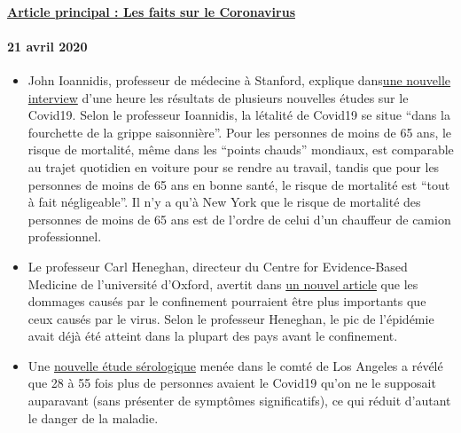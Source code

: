 \hypertarget{article-principal--les-faits-sur-le-coronavirus}{%
\paragraph{\texorpdfstring{\href{https://swprs.org/coronavirus-un-medecin-suisse-parle/}{Article
principal : Les faits sur le
Coronavirus}}{Article principal : Les faits sur le Coronavirus}}\label{article-principal--les-faits-sur-le-coronavirus}}

\hypertarget{21-avril-2020}{%
\paragraph{21 avril 2020}\label{21-avril-2020}}

\begin{itemize}
\tightlist
\item
  John Ioannidis, professeur de médecine à Stanford, explique
  dans\href{https://www.youtube.com/watch?v=cwPqmLoZA4s}{une nouvelle
  interview} d'une heure les résultats de plusieurs nouvelles études sur
  le Covid19. Selon le professeur Ioannidis, la létalité de Covid19 se
  situe ``dans la fourchette de la grippe saisonnière''. Pour les
  personnes de moins de 65 ans, le risque de mortalité, même dans les
  ``points chauds'' mondiaux, est comparable au trajet quotidien en
  voiture pour se rendre au travail, tandis que pour les personnes de
  moins de 65 ans en bonne santé, le risque de mortalité est ``tout à
  fait négligeable''. Il n'y a qu'à New York que le risque de mortalité
  des personnes de moins de 65 ans est de l'ordre de celui d'un
  chauffeur de camion professionnel.
\item
  Le professeur Carl Heneghan, directeur du Centre for Evidence-Based
  Medicine de l'université d'Oxford, avertit dans
  \href{https://news.yahoo.com/lockdown-damage-outweighs-coronavirus-warning-121940675.html}{un
  nouvel article} que les dommages causés par le confinement pourraient
  être plus importants que ceux causés par le virus. Selon le professeur
  Heneghan, le pic de l'épidémie avait déjà été atteint dans la plupart
  des pays avant le confinement.
\item
  Une
  \href{http://publichealth.lacounty.gov/phcommon/public/media/mediapubhpdetail.cfm?prid=2328}{nouvelle
  étude sérologique} menée dans le comté de Los Angeles a révélé que 28
  à 55 fois plus de personnes avaient le Covid19 qu'on ne le supposait
  auparavant (sans présenter de symptômes significatifs), ce qui réduit
  d'autant le danger de la maladie.

\end{itemize}
